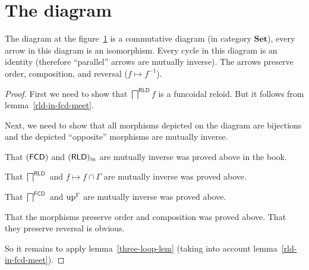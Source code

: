 \section{The diagram}
\begin{thm}
\label{fcd-diagram}The diagram at the figure~\ref{gamma-dia} is
a commutative diagram (in category $\mathbf{Set}$), every arrow in
this diagram is an isomorphism. Every cycle in this diagram is an
identity (therefore ``parallel'' arrows are mutually inverse). The
arrows preserve order, composition, and reversal ($f\mapsto f^{-1}$).

\begin{figure}[ht]
\caption{\label{gamma-dia}}
\end{figure}
\end{thm}
\begin{proof}
First we need to show that $\bigsqcap^{\mathsf{RLD}}f$ is a funcoidal
reloid. But it follows from lemma~\ref{rld-in-fcd-meet}.

Next, we need to show that all morphisms depicted on the diagram are
bijections and the depicted ``opposite'' morphisms are mutually
inverse.

That $(\mathsf{FCD})$ and $(\mathsf{RLD})_{\mathrm{in}}$ are mutually inverse was proved above
in the book.

That $\bigsqcap^{\mathsf{RLD}}$ and $f\mapsto f\cap\Gamma$ are mutually
inverse was proved above.

That $\bigsqcap^{\mathsf{FCD}}$ and $\operatorname{up}^{\Gamma}$ are mutually
inverse was proved above.

That the morphisms preserve order and composition was proved above.
That they preserve reversal is obvious.

So it remains to apply lemma~\ref{three-loop-lem} (taking into account
lemma~\ref{rld-in-fcd-meet}).
\end{proof}

